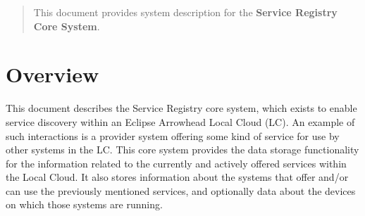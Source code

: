 \documentclass[a4paper]{arrowhead}
\begin{document}
\ArrowheadDate{\today}
\ArrowheadSetup

\begin{center}
  \vspace*{1cm}
  \huge{\arrowtitle}

  \vspace*{0.2cm}
  \LARGE{\arrowtype}
  \vspace*{1cm}

  \vspace*{\fill}


  \vspace*{1cm}
  \vspace*{\fill}

  \begin{abstract}
    This document provides system description for the \textbf{Service Registry Core System}.
  \end{abstract}

  \vspace*{1cm}

 \end{center}

\newpage

\tableofcontents
\newpage

\section{Overview}
\label{sec:overview}
\color{black}
This document describes the Service Registry core system, which exists to enable service discovery within an Eclipse Arrowhead Local Cloud (LC). An example of such interactions is a provider system offering some kind of service for use by other systems in the LC. This core system provides the data storage functionality for the information related to the currently and actively offered services within the Local Cloud. It also stores information about the systems that offer and/or can use the previously mentioned services, and optionally data about the devices on which those systems are running.
\end{document}
